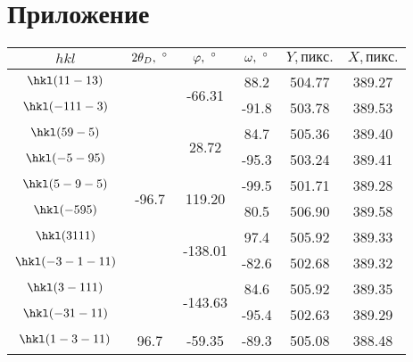 \section*{Приложение}

\begin{table}[ht!]
    \centering
    \begin{tabular}{ |c|c|c|c|c|c| }
        \hline
                    $hkl$ &  $2\theta_D, \ \degree$ &     $\varphi, \ \degree$ & $\omega, \ \degree$ &    $Y,\unit{пикс.}$ &    $X,\unit{пикс.}$ \\
        \hline
        $  \hkl(11 -1 3)$ & \multirow{10}{*}{-96.7} &  \multirow{2}{*}{-66.31} &                88.2 &              504.77 &              389.27 \\
        $ \hkl(-11 1 -3)$ &                         &                          &               -91.8 &              503.78 &              389.53 \\
        $   \hkl(5 9 -5)$ &                         &   \multirow{2}{*}{28.72} &                84.7 &              505.36 &              389.40 \\
        $  \hkl(-5 -9 5)$ &                         &                          &               -95.3 &              503.24 &              389.41 \\
        $  \hkl(5 -9 -5)$ &                         &  \multirow{2}{*}{119.20} &               -99.5 &              501.71 &              389.28 \\
        $   \hkl(-5 9 5)$ &                         &                          &                80.5 &              506.90 &              389.58 \\
        $   \hkl(3 1 11)$ &                         & \multirow{2}{*}{-138.01} &                97.4 &              505.92 &              389.33 \\
        $\hkl(-3 -1 -11)$ &                         &                          &               -82.6 &              502.68 &              389.32 \\
        $  \hkl(3 -1 11)$ &                         & \multirow{2}{*}{-143.63} &                84.6 &              505.92 &              389.35 \\
        $ \hkl(-3 1 -11)$ &                         &                          &               -95.4 &              502.63 &              389.29 \\
        \hline
        $ \hkl(1 -3 -11)$ &  \multirow{10}{*}{96.7} &  \multirow{2}{*}{-59.35} &               -89.3 &              505.08 &              388.48 \\

\end{tabular}
\end{table}
